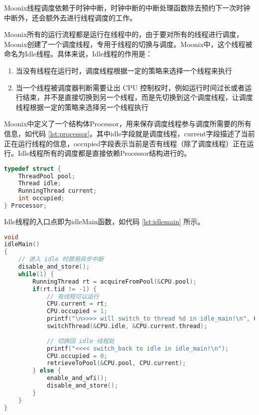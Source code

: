 Moonix线程调度依赖于时钟中断，时钟中断的中断处理函数除去预约下一次时钟中断外，还会额外去进行线程调度的工作。

Moonix所有的运行流程都是运行在线程中的，由于要对所有的线程进行调度，Moonix创建了一个调度线程，专用于线程的切换与调度。Moonix中，这个线程被命名为Idle线程。具体来说，Idle线程的作用是：

\begin{enumerate}
	\item 当没有线程在运行时，调度线程根据一定的策略来选择一个线程来执行
	\item 当一个线程被调度器判断需要让出 CPU 控制权时，例如运行时间过长或者运行结束，并不是直接切换到另一个线程，而是先切换到这个调度线程，让调度线程根据一定的策略来选择另一个线程执行
\end{enumerate}

Moonix中定义了一个结构体Processor，用来保存调度线程参与调度所需要的所有信息，如代码 \ref{lst:processor}。其中idle字段就是调度线程，current字段描述了当前正在运行线程的信息，occupied字段表示当前是否有线程（除了调度线程）正在运行。Idle线程所有的调度都是直接依赖Processor结构进行的。

\begin{minipage}[c]{0.95\textwidth}
\begin{lstlisting}[language={C}, caption={Processor结构体}, label={lst:processor}]
typedef struct {
	ThreadPool pool;
	Thread idle;
	RunningThread current;
	int occupied;
} Processor;
\end{lstlisting}
\end{minipage}

Idle线程的入口点即为idleMain函数，如代码 \ref{lst:idlemain} 所示。

\begin{minipage}[c]{0.95\textwidth}
\begin{lstlisting}[language={C}, caption={idleMain函数}, label={lst:idlemain}]
void
idleMain()
{
	// 进入 idle 时禁用异步中断
	disable_and_store();
	while(1) {
		RunningThread rt = acquireFromPool(&CPU.pool);
		if(rt.tid != -1) {
			// 有线程可以运行
			CPU.current = rt;
			CPU.occupied = 1;
			printf("\n>>>> will switch_to thread %d in idle_main!\n", CPU.current.tid);
			switchThread(&CPU.idle, &CPU.current.thread);
			
			// 切换回 idle 线程处
			printf("<<<< switch_back to idle in idle_main!\n");
			CPU.occupied = 0;
			retrieveToPool(&CPU.pool, CPU.current);
		} else {
			enable_and_wfi();
			disable_and_store();
		}
	}
}
\end{lstlisting}
\end{minipage}

